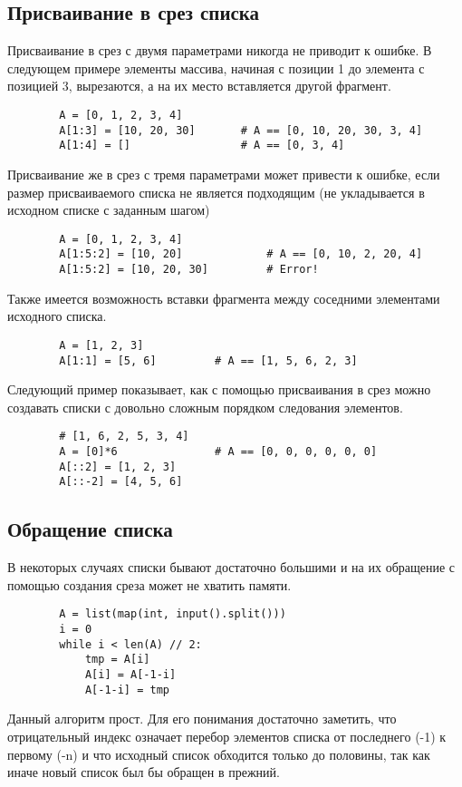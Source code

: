 \documentclass[a4paper, fleqn]{article}
\begin{document}
	
	
	
	\subsection*{Присваивание в срез списка}
	
	Присваивание в срез с двумя параметрами никогда не приводит к ошибке. В следующем примере элементы массива, начиная с позиции 1 до элемента с позицией 3, вырезаются, а на их место вставляется другой фрагмент.
	\begin{lstlisting}
		A = [0, 1, 2, 3, 4]
		A[1:3] = [10, 20, 30]		# A == [0, 10, 20, 30, 3, 4]
		A[1:4] = []					# A == [0, 3, 4]
	\end{lstlisting}
	Присваивание же в срез с тремя параметрами может привести к ошибке, если размер присваиваемого списка не является подходящим (не укладывается в исходном списке с заданным шагом) 
	\begin{lstlisting}
		A = [0, 1, 2, 3, 4]
		A[1:5:2] = [10, 20]				# A == [0, 10, 2, 20, 4]
		A[1:5:2] = [10, 20, 30]			# Error!	
	\end{lstlisting}
	Также имеется возможность вставки фрагмента между соседними элементами исходного списка.
	\begin{lstlisting}
		A = [1, 2, 3]
		A[1:1] = [5, 6]			# A == [1, 5, 6, 2, 3]
	\end{lstlisting}
	Следующий пример показывает, как с помощью присваивания в срез можно создавать списки с довольно сложным порядком следования элементов.
	\begin{lstlisting}
		# [1, 6, 2, 5, 3, 4]
		A = [0]*6				# A == [0, 0, 0, 0, 0, 0]
		A[::2] = [1, 2, 3]
		A[::-2] = [4, 5, 6]
	\end{lstlisting}
	
	
	
	\subsection*{Обращение списка}
	
	В некоторых случаях списки бывают достаточно большими и на их обращение с помощью создания среза может не хватить памяти.  
	\begin{lstlisting}
		A = list(map(int, input().split()))
		i = 0
		while i < len(A) // 2:
			tmp = A[i]
			A[i] = A[-1-i]
			A[-1-i] = tmp
	\end{lstlisting}
	Данный алгоритм прост. Для его понимания достаточно заметить, что отрицательный индекс означает перебор элементов списка от последнего (-1) к первому (-n) и что исходный список обходится только до половины, так как иначе новый список был бы обращен в прежний.
	
\end{document}
